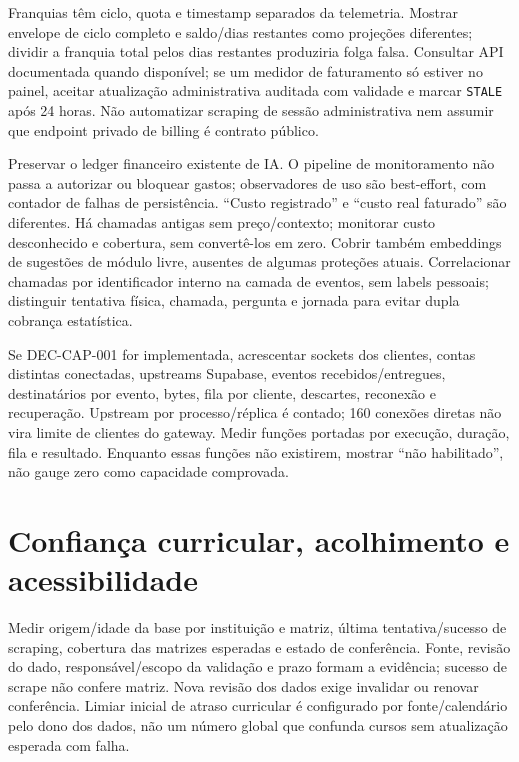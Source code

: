 \documentclass[10pt,a4paper]{article}
\begin{document}
Franquias têm ciclo, quota e timestamp separados da telemetria. Mostrar
envelope de ciclo completo e saldo/dias restantes como projeções
diferentes; dividir a franquia total pelos dias restantes produziria
folga falsa. Consultar API documentada quando disponível; se um medidor
de faturamento só estiver no painel, aceitar atualização administrativa
auditada com validade e marcar {\footnotesize\ttfamily\nolinkurl{STALE}} após 24 horas. Não
automatizar scraping de sessão administrativa nem assumir que endpoint
privado de billing é contrato público.

Preservar o ledger financeiro existente de IA. O pipeline de
monitoramento não passa a autorizar ou bloquear gastos; observadores de
uso são best-effort, com contador de falhas de persistência. ``Custo
registrado'' e ``custo real faturado'' são diferentes. Há chamadas
antigas sem preço/contexto; monitorar custo desconhecido e cobertura,
sem convertê-los em zero. Cobrir também embeddings de sugestões de
módulo livre, ausentes de algumas proteções atuais. Correlacionar
chamadas por identificador interno na camada de eventos, sem labels
pessoais; distinguir tentativa física, chamada, pergunta e jornada para
evitar dupla cobrança estatística.

Se DEC-CAP-001 for implementada, acrescentar sockets dos clientes,
contas distintas conectadas, upstreams Supabase, eventos
recebidos/entregues, destinatários por evento, bytes, fila por cliente,
descartes, reconexão e recuperação. Upstream por processo/réplica é
contado; 160 conexões diretas não vira limite de clientes do gateway.
Medir funções portadas por execução, duração, fila e resultado. Enquanto
essas funções não existirem, mostrar ``não habilitado'', não gauge zero
como capacidade comprovada.

\clearpage
\section{Confiança curricular, acolhimento e
acessibilidade}\label{confianuxe7a-curricular-acolhimento-e-acessibilidade}

Medir origem/idade da base por instituição e matriz, última
tentativa/sucesso de scraping, cobertura das matrizes esperadas e estado
de conferência. Fonte, revisão do dado, responsável/escopo da validação
e prazo formam a evidência; sucesso de scrape não confere matriz. Nova
revisão dos dados exige invalidar ou renovar conferência. Limiar inicial
de atraso curricular é configurado por fonte/calendário pelo dono dos
dados, não um número global que confunda cursos sem atualização esperada
com falha.
\end{document}
